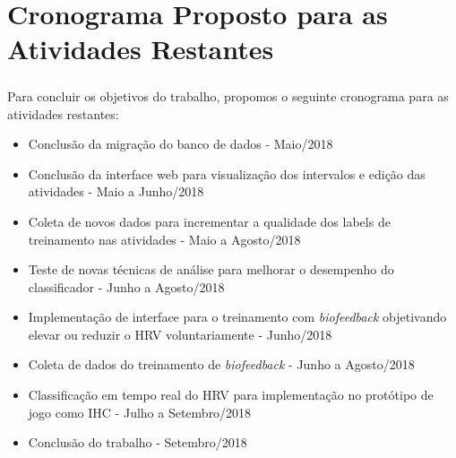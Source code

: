 
\chapter{Cronograma Proposto para as Atividades Restantes} %

\label{AppendixA} %

\paragraph{} Para concluir os objetivos do trabalho, propomos o seguinte cronograma para as atividades restantes:

\begin{itemize}
    \item Conclusão da migração do banco de dados - Maio/2018
    \item Conclusão da interface web para visualização dos intervalos e edição das atividades - Maio a Junho/2018
    \item Coleta de novos dados para incrementar a qualidade dos labels de treinamento nas atividades - Maio a Agosto/2018
    \item Teste de novas técnicas de análise para melhorar o desempenho do classificador - Junho a Agosto/2018
    \item Implementação de interface para o treinamento com \textit{biofeedback} objetivando elevar ou reduzir o HRV voluntariamente - Junho/2018
    \item Coleta de dados do treinamento de \textit{biofeedback} - Junho a Agosto/2018
    \item Classificação em tempo real do HRV para implementação no protótipo de jogo como IHC - Julho a Setembro/2018
    \item Conclusão do trabalho - Setembro/2018
\end{itemize}